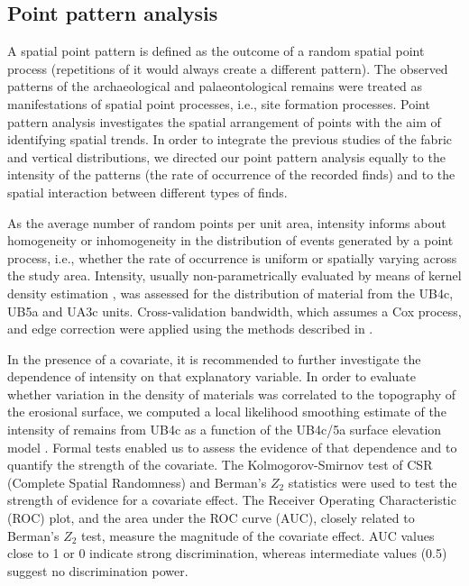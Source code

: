 \documentclass[review,authoryear,times]{elsarticle} %
\begin{document}
\subsection{Point pattern analysis}

A spatial point pattern is defined as the outcome of a random spatial point process (repetitions of it would always create a different pattern). The observed patterns of the archaeological and palaeontological remains were treated as manifestations of spatial point processes, i.e., site formation processes. Point pattern analysis investigates the spatial arrangement of points with the aim of identifying spatial trends. In order to integrate the previous studies of the fabric and vertical distributions, we directed our point pattern analysis equally to the intensity of the patterns (the rate of occurrence of the recorded finds) and to the spatial interaction between different types of finds.

As the average number of random points per unit area, intensity informs about homogeneity or inhomogeneity in the distribution of events generated by a point process, i.e., whether the rate of occurrence is uniform or spatially varying across the study area. Intensity, usually non-parametrically evaluated by means of kernel density estimation \citep{Diggle1985}, was assessed for the distribution of material from the UB4c, UB5a and UA3c units. Cross-validation bandwidth, which assumes a Cox process, and edge correction were applied using the methods described in \cite{Diggle1985}.

In the presence of a covariate, it is recommended to further investigate the dependence of intensity on that explanatory variable. In order to evaluate whether variation in the density of materials was correlated to the topography of the erosional surface, we computed a local likelihood smoothing estimate of the intensity of remains from UB4c as a function of the UB4c/5a surface elevation model \citep{Baddeley2012}. Formal tests enabled us to assess the evidence of that dependence and to quantify the strength of the covariate. The Kolmogorov-Smirnov test of CSR (Complete Spatial Randomness) and Berman's $Z_2$ statistics were used to test the strength of evidence for a covariate effect. The Receiver Operating Characteristic (ROC) plot, and the area under the ROC curve (AUC), closely related to Berman's $Z_2$ test, measure the magnitude of the covariate effect. AUC values close to 1 or 0 indicate strong discrimination, whereas intermediate values (0.5) suggest no discrimination power.
\end{document}
